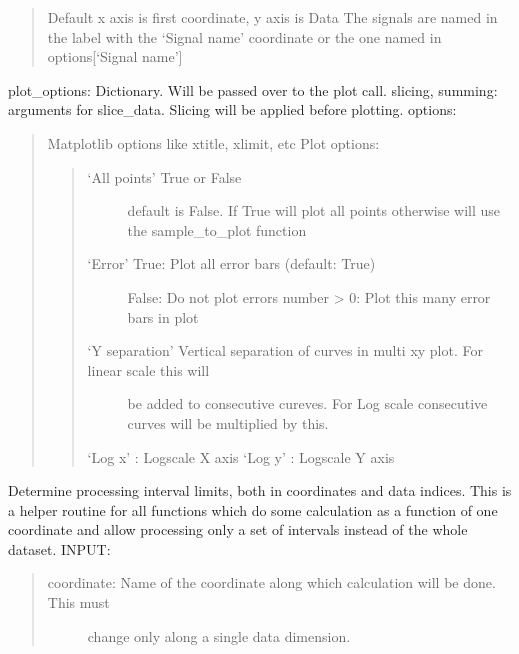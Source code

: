 \documentclass[letterpaper,10pt,english]{sphinxmanual}
\begin{document}
\begin{fulllineitems}
\begin{fulllineitems}
\begin{description}
\begin{quote}
Default x axis is first coordinate, y axis is Data
The signals are named in the label with the ‘Signal name’ coordinate or the one
named in options{[}‘Signal name’{]}
\end{quote}

\end{description}

plot\_options: Dictionary. Will be passed over to the plot call.
slicing, summing: arguments for slice\_data. Slicing will be applied before plotting.
options:
\begin{quote}

Matplotlib options like xtitle, xlimit, etc
Plot options:
\begin{quote}
\begin{description}
\item[{‘All points’ True or False}] \leavevmode
default is False. If True will plot all points otherwise will use
the sample\_to\_plot function

\item[{‘Error’      True: Plot all error bars (default: True)}] \leavevmode
False: Do not plot errors
number \textgreater{} 0: Plot this many error bars in plot

\item[{‘Y separation’ Vertical separation of curves in multi xy plot. For linear scale this will}] \leavevmode
be added to consecutive cureves. For Log scale consecutive curves will be
multiplied by this.

\end{description}

‘Log x’ : Logscale X axis
‘Log y’ : Logscale Y axis
\end{quote}
\end{quote}

\end{fulllineitems}


\begin{fulllineitems}
\label{\detokenize{data_object:flap.data_object.DataObject.proc_interval_limits}}
Determine processing interval limits, both in coordinates and data indices.
This is a helper routine for all functions which do some calculation as a function
of one coordinate and allow processing only a set of intervals instead of the whole dataset.
INPUT:
\begin{quote}
\begin{description}
\item[{coordinate: Name of the coordinate along which calculation will be done. This must}] \leavevmode
change only along a single data dimension.


\end{description}
\end{quote}
\end{fulllineitems}
\end{fulllineitems}
\end{document}
